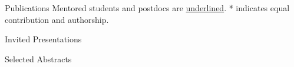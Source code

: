 \documentclass{resume}
\begin{document}
\begin{rSection}{Publications}
	Mentored students and postdocs are \underline{underlined}. * indicates equal contribution and authorship. 
	\renewcommand\refname{}
	\vspace{-36pt}

	\nocite{krinos2023reverse, mars2022microbiomes,Cohen2022,Clayton2022,mcparland2021osmolyte, Krinos2021,mcparland2021dmsp,fiore2021phosphate, Alexander2020, Johnson2020, Choi_2020, Bolyen2019, Wurch2019, Alexander2018, Johnson2018, Hu2018, Rouco2018, Haley2017, Harke2017, Moniruzzaman2017, Kujawinski2017, Guy-Haim2017,Durden2017,Caron2016, Rouco2016,Alexander2015a, Alexander2015,Fischer2014, Alexander2012, Dyhrman2012}

	

	

\end{rSection}


\begin{rSection}{Invited Presentations}
	\renewcommand\refnameipr{}
	\vspace{-20pt}

\end{rSection}


\begin{rSection}{Selected Abstracts}
	\renewcommand\refnamepr{}
	\vspace{-20pt}

\end{rSection}
\end{document}

